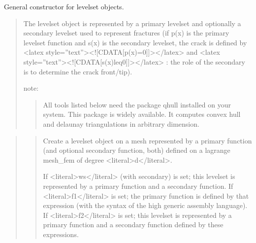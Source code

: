 \documentclass[a4paper,11pt,english]{sphinxmanual}
\begin{document}
\sphinxAtStartPar
{}

\sphinxAtStartPar
General constructor for levelset objects.
\begin{quote}

\sphinxAtStartPar
The level\sphinxhyphen{}set object is represented by a primary level\sphinxhyphen{}set and optionally
a secondary level\sphinxhyphen{}set used to represent fractures (if p(x) is the primary
level\sphinxhyphen{}set function and s(x) is the secondary level\sphinxhyphen{}set, the crack is
defined by \textless{}latex style=”text”\textgreater{}\textless{}!{[}CDATA{[}p(x)=0{]}{]}\textgreater{}\textless{}/latex\textgreater{} and \textless{}latex style=”text”\textgreater{}\textless{}!{[}CDATA{[}s(x)leq0{]}{]}\textgreater{}\textless{}/latex\textgreater{} : the role of the secondary is to determine
the crack front/tip).

\sphinxAtStartPar
note:
\begin{quote}

\sphinxAtStartPar
All tools listed below need the package qhull installed on your
system. This package is widely available. It computes convex hull and
delaunay triangulations in arbitrary dimension.
\end{quote}
\end{quote}

\sphinxAtStartPar
{}
\begin{quote}

\sphinxAtStartPar
{}
\begin{quote}

\sphinxAtStartPar
Create a levelset object on a mesh represented by a primary function
(and optional secondary function, both) defined on a lagrange mesh\_fem of
degree \textless{}literal\textgreater{}d\textless{}/literal\textgreater{}.

\sphinxAtStartPar
If \textless{}literal\textgreater{}ws\textless{}/literal\textgreater{} (with secondary) is set; this levelset is represented by a
primary function and a secondary function. If \textless{}literal\textgreater{}f1\textless{}/literal\textgreater{} is set; the primary
function is defined by that expression (with the syntax of the high
generic assembly language). If \textless{}literal\textgreater{}f2\textless{}/literal\textgreater{} is set; this levelset
is represented by a primary function and a secondary function defined
by these expressions.
\end{quote}
\end{quote}
\end{document}
